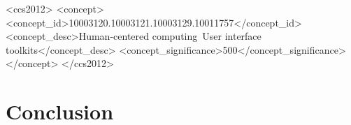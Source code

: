 \documentclass[sigchi, review]{acmart}
\begin{document}
\begin{CJK*}{UTF8}{gbsn}
\begin{abstract}

\end{abstract}

%
%
\begin{CCSXML}
<ccs2012>
<concept>
<concept_id>10003120.10003121.10003129.10011757</concept_id>
<concept_desc>Human-centered computing~User interface toolkits</concept_desc>
<concept_significance>500</concept_significance>
</concept>
</ccs2012>
\end{CCSXML}



\maketitle













\section{Conclusion}


\end{CJK*}
\end{document}
